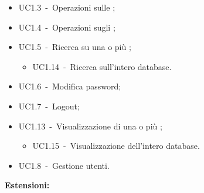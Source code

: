\documentclass{scalatekids-article}
\begin{document}
\begin{itemize}
\item UC1.3\ -\ Operazioni sulle ;
\item UC1.4\ -\ Operazioni sugli ;
\item UC1.5\ -\ Ricerca su una o più ;
  \begin{itemize}
  \item UC1.14\ -\ Ricerca sull'intero database.
  \end{itemize}
\item UC1.6\ -\ Modifica password;
\item UC1.7\ -\ Logout;
\item UC1.13\ -\ Visualizzazione di una o più ;
  \begin{itemize}
  \item UC1.15\ -\ Visualizzazione dell'intero database.
  \end{itemize}
\end{itemize}
\begin{itemize}
\item UC1.8\ -\ Gestione utenti.
\end{itemize}
\textbf{Estensioni:}
\end{document}
